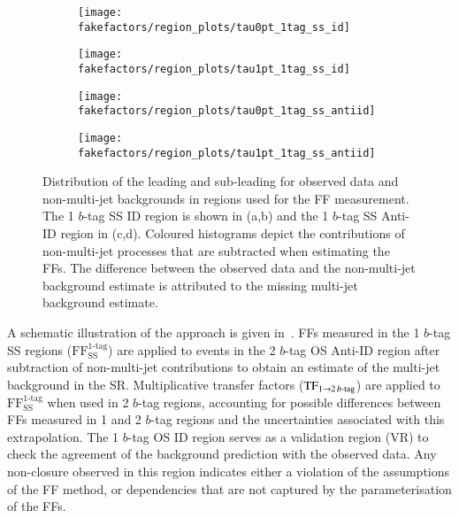 \begin{figure}[htbp]
  \centering

  \begin{subfigure}{0.49\textwidth}
    \texttt{[image: fakefactors/region\_plots/tau0pt\_1tag\_ss\_id]}
  \end{subfigure}
  \begin{subfigure}{0.49\textwidth}
    \texttt{[image: fakefactors/region\_plots/tau1pt\_1tag\_ss\_id]}
  \end{subfigure}

  \begin{subfigure}{0.49\textwidth}
    \texttt{[image: fakefactors/region\_plots/tau0pt\_1tag\_ss\_antiid]}
  \end{subfigure}
  \begin{subfigure}{0.49\textwidth}
    \texttt{[image: fakefactors/region\_plots/tau1pt\_1tag\_ss\_antiid]}
  \end{subfigure}

  \caption[Distribution of the leading and sub-leading \tauhadvis \pT for
  observed data and non-multi-jet backgrounds in regions used for the FF
  measurement.]{Distribution of the leading and sub-leading \tauhadvis \pT for
    observed data and non-multi-jet backgrounds in regions used for the FF
    measurement. The 1 $b$-tag SS ID region is shown in (a,b) and the 1 $b$-tag
    SS Anti-ID region in (c,d). Coloured histograms depict the contributions of
    non-multi-jet processes that are subtracted when estimating the FFs. The
    difference between the observed data and the non-multi-jet background
    estimate is attributed to the missing multi-jet background estimate.}%
  \label{fig:mjfakes_1tag_ss_plots}
\end{figure}

A schematic illustration of the approach is given
in~. FFs measured in the 1 $b$-tag SS regions
($\text{FF}_\text{SS}^\text{1-tag}$) are applied to events in the 2 $b$-tag OS
Anti-ID region after subtraction of non-multi-jet contributions to obtain an
estimate of the multi-jet background in the SR. Multiplicative transfer factors
($\text{TF}_{1 \rightarrow 2\,b\text{-tag}}$) are applied to
$\text{FF}_\text{SS}^\text{1-tag}$ when used in 2 $b$-tag regions, accounting
for possible differences between FFs measured in 1 and 2 $b$-tag regions and the
uncertainties associated with this extrapolation. The 1 $b$-tag OS ID region
serves as a validation region (VR) to check the agreement of the background
prediction with the observed data. Any non-closure observed in this region
indicates either a violation of the assumptions of the FF method, or
dependencies that are not captured by the parameterisation of the FFs.

